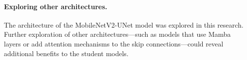 \paragraph{Exploring other architectures.} The architecture of the MobileNetV2-UNet model was explored in
this research. Further exploration of other architectures---such as models that use Mamba layers or add
attention mechanisms to the skip connections---could reveal additional benefits to the student models.
